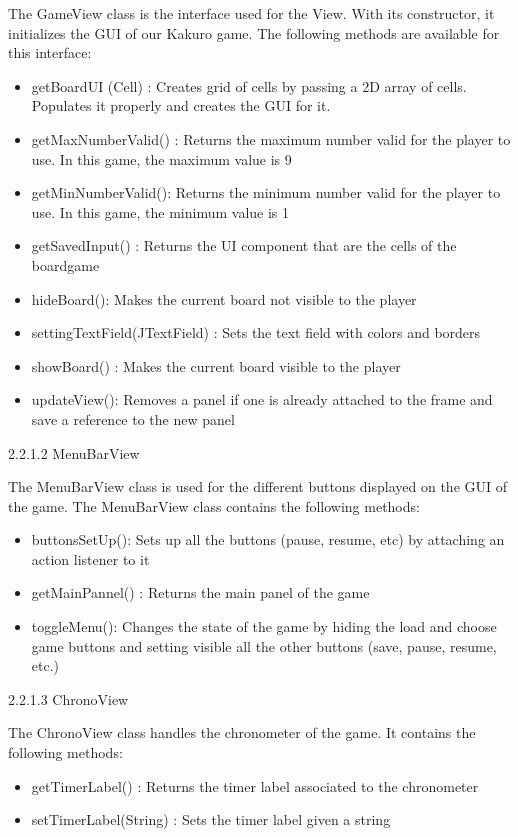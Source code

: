 \documentclass[12pt]{article}
\begin{document}
The GameView class is the interface used for the View. With its constructor, it initializes the GUI of our Kakuro game. The following methods are available for this interface:
\newline
\begin{itemize}
\item getBoardUI (Cell) : Creates grid of cells by passing a 2D array of cells. Populates it properly and creates the GUI for it.
\item getMaxNumberValid() : Returns the maximum number valid for the player to use. In this game, the maximum value is 9
\item getMinNumberValid(): Returns the minimum number valid for the player to use. In this game, the minimum value is 1
\item getSavedInput() : Returns the UI component that are the cells of the boardgame
\item hideBoard(): Makes the current board not visible to the player
\item settingTextField(JTextField) : Sets the text field with colors and borders
\item showBoard() : Makes the current board visible to the player
\item updateView(): Removes a panel if one is already attached to the frame and save a reference to the new panel\newline
\end{itemize} 


2.2.1.2 MenuBarView\newline

The MenuBarView class is used for the different buttons displayed on the GUI of the game. The MenuBarView class contains the following methods:
\newline
\begin{itemize}
\item buttonsSetUp(): Sets up all the buttons (pause, resume, etc) by attaching an action listener to it
\item getMainPannel() : Returns the main panel of the game
\item toggleMenu(): Changes the state of the game by hiding the load and choose game buttons and setting visible all the other buttons (save, pause, resume, etc.) \newline
\end{itemize}

2.2.1.3 ChronoView\newline

The ChronoView class handles the chronometer of the game. It contains the following methods:\newline
\begin{itemize}
\item getTimerLabel() : Returns the timer label associated to the chronometer
\item setTimerLabel(String) : Sets the timer label given a string\newline
\end{itemize}
\end{document}
